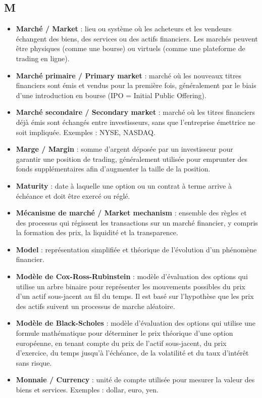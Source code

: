 \documentclass[a4paper,10pt]{article}
\begin{document}
\begin{multicols}{2}
\section*{M}
\begin{itemize}
  \item \textbf{Marché / Market} : lieu ou système où les acheteurs et les vendeurs échangent des biens, des services ou des actifs financiers. Les marchés peuvent être physiques (comme une bourse) ou virtuels (comme une plateforme de trading en ligne).
  \item \textbf{Marché primaire / Primary market} : marché où les nouveaux titres financiers sont émis et vendus pour la première fois, généralement par le biais d’une introduction en bourse (IPO = Initial Public Offering).
  \item \textbf{Marché secondaire / Secondary market} : marché où les titres financiers déjà émis sont échangés entre investisseurs, sans que l’entreprise émettrice ne soit impliquée. Exemples : NYSE, NASDAQ.
  \item \textbf{Marge / Margin} : somme d’argent déposée par un investisseur pour garantir une position de trading, généralement utilisée pour emprunter des fonds supplémentaires afin d’augmenter la taille de la position.
  \item \textbf{Maturity} : date à laquelle une option ou un contrat à terme arrive à échéance et doit être exercé ou réglé.
  \item \textbf{Mécanisme de marché / Market mechanism} : ensemble des règles et des processus qui régissent les transactions sur un marché financier, y compris la formation des prix, la liquidité et la transparence.
  \item \textbf{Model} : représentation simplifiée et théorique de l’évolution d’un phénomène financier.
  \item \textbf{Modèle de Cox-Ross-Rubinstein} : modèle d’évaluation des options qui utilise un arbre binaire pour représenter les mouvements possibles du prix d’un actif sous-jacent au fil du temps. Il est basé sur l’hypothèse que les prix des actifs suivent un processus de marche aléatoire.
  \item \textbf{Modèle de Black-Scholes} : modèle d’évaluation des options qui utilise une formule mathématique pour déterminer le prix théorique d’une option européenne, en tenant compte du prix de l’actif sous-jacent, du prix d’exercice, du temps jusqu’à l’échéance, de la volatilité et du taux d’intérêt sans risque.
  \item \textbf{Monnaie / Currency} : unité de compte utilisée pour mesurer la valeur des biens et services. Exemples : dollar, euro, yen.
\end{itemize}


\end{multicols}
\end{document}
